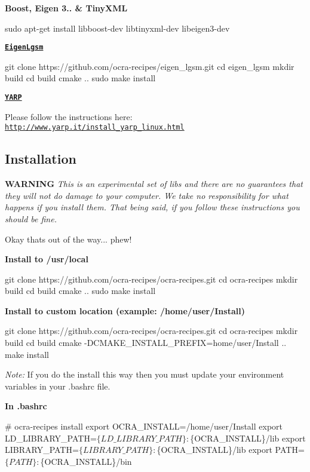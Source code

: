 {\bfseries Boost, Eigen 3.. \& Tiny\+X\+ML} 
\begin{DoxyCode}
sudo apt-get install libboost-dev libtinyxml-dev libeigen3-dev
\end{DoxyCode}
 \href{https://github.com/ocra-recipes/eigen_lgsm}{\tt {\bfseries Eigen\+Lgsm}} 
\begin{DoxyCode}
git clone https://github.com/ocra-recipes/eigen\_lgsm.git
cd eigen\_lgsm
mkdir build
cd build
cmake ..
sudo make install
\end{DoxyCode}


\href{http://www.yarp.it}{\tt {\bfseries Y\+A\+RP}}

Please follow the instructions here\+: \href{http://www.yarp.it/install_yarp_linux.html}{\tt http\+://www.\+yarp.\+it/install\+\_\+yarp\+\_\+linux.\+html}

\subsection*{Installation}

{\bfseries W\+A\+R\+N\+I\+NG} {\itshape This is an experimental set of libs and there are no guarantees that they will not do damage to your computer. We take no responsibility for what happens if you install them. That being said, if you follow these instructions you should be fine.}

Okay that\textquotesingle{}s out of the way... phew!

{\bfseries Install to /usr/local} 
\begin{DoxyCode}
git clone https://github.com/ocra-recipes/ocra-recipes.git
cd ocra-recipes
mkdir build
cd build
cmake ..
sudo make install
\end{DoxyCode}


{\bfseries Install to custom location (example\+: /home/user/\+Install)} 
\begin{DoxyCode}
git clone https://github.com/ocra-recipes/ocra-recipes.git
cd ocra-recipes
mkdir build
cd build
cmake -DCMAKE\_INSTALL\_PREFIX=home/user/Install ..
make install
\end{DoxyCode}
 {\itshape Note\+:} If you do the install this way then you must update your environment variables in your {\ttfamily .bashrc} file.

{\bfseries In {\ttfamily .bashrc}} 
\begin{DoxyCode}
# ocra-recipes install
export OCRA\_INSTALL=/home/user/Install
export LD\_LIBRARY\_PATH=$\{LD\_LIBRARY\_PATH\}:$\{OCRA\_INSTALL\}/lib
export LIBRARY\_PATH=$\{LIBRARY\_PATH\}:$\{OCRA\_INSTALL\}/lib
export PATH=$\{PATH\}:$\{OCRA\_INSTALL\}/bin
\end{DoxyCode}


